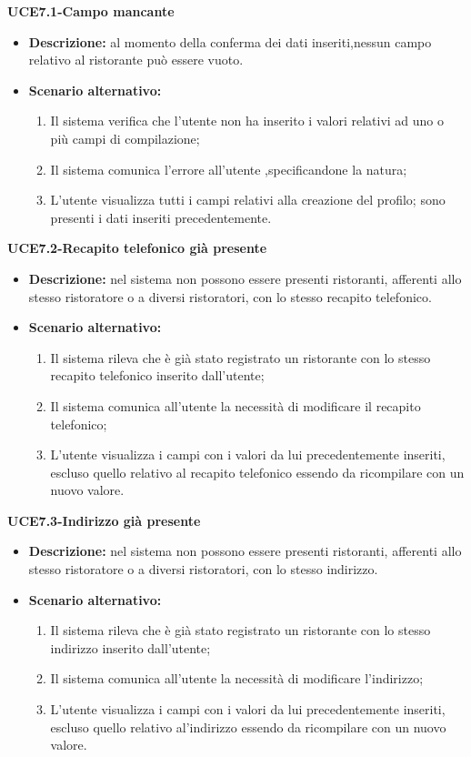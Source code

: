 \textbf{UCE7.1-Campo mancante}
\begin{itemize}
    \item \textbf{Descrizione: }al momento della conferma dei dati inseriti,nessun campo relativo al ristorante può essere vuoto.
    \item \textbf{Scenario alternativo:}
    \begin{enumerate}
        \item Il sistema verifica che l'utente non ha inserito i valori relativi ad uno o più campi di
        compilazione;
        \item Il sistema comunica l'errore all'utente ,specificandone la natura;
        \item L'utente visualizza tutti i campi relativi alla creazione del profilo; sono presenti i dati inseriti precedentemente.
    \end{enumerate}
\end{itemize}

\textbf{UCE7.2-Recapito telefonico già presente}
\begin{itemize}
    \item \textbf{Descrizione: }nel sistema non possono essere presenti ristoranti, afferenti allo stesso ristoratore
    o a diversi ristoratori, con lo stesso recapito telefonico.
    \item \textbf{Scenario alternativo:}
    \begin{enumerate}
        \item Il sistema rileva che è già stato registrato un ristorante con lo stesso recapito telefonico
        inserito dall'utente;
        \item Il sistema comunica all'utente la necessità di modificare il recapito telefonico;
        \item L'utente visualizza i campi con i valori da lui precedentemente inseriti, escluso quello relativo al recapito telefonico
        essendo da ricompilare con un nuovo valore.
    \end{enumerate}
\end{itemize}

\textbf{UCE7.3-Indirizzo già presente}
\begin{itemize}
    \item \textbf{Descrizione: }nel sistema non possono essere presenti ristoranti, afferenti allo stesso ristoratore
    o a diversi ristoratori, con lo stesso indirizzo.
    \item \textbf{Scenario alternativo:}
    \begin{enumerate}
        \item Il sistema rileva che è già stato registrato un ristorante con lo stesso indirizzo
        inserito dall'utente;
        \item Il sistema comunica all'utente la necessità di modificare l'indirizzo;
        \item L'utente visualizza i campi con i valori da lui precedentemente inseriti, escluso quello relativo al'indirizzo
        essendo da ricompilare con un nuovo valore.
    \end{enumerate}
\end{itemize}

